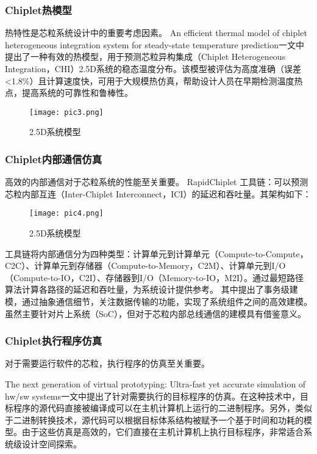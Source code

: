 \documentclass[bachelor]{thesis-uestc}
\begin{document}
\subsubsection{Chiplet热模型}
热特性是芯粒系统设计中的重要考虑因素。
An efficient thermal model of chiplet heterogeneous integration system for steady-state temperature prediction一文中提出了一种有效的热模型，用于预测芯粒异构集成（Chiplet Heterogeneous Integration，CHI）2.5D系统的稳态温度分布。该模型被评估为高度准确（误差 <1.8\%）且计算速度快，可用于大规模热仿真，帮助设计人员在早期检测温度热点，提高系统的可靠性和鲁棒性。
\begin{figure}[h]
    \texttt{[image: pic3.png]}
    \caption{2.5D系统模型}
    \label{pic3}
    \end{figure}


\subsubsection{Chiplet内部通信仿真}
高效的内部通信对于芯粒系统的性能至关重要。
RapidChiplet 工具链：可以预测芯粒内部互连（Inter-Chiplet Interconnect，ICI）的延迟和吞吐量。其架构如下：
\begin{figure}[h]
    \texttt{[image: pic4.png]}
    \caption{2.5D系统模型}
    \label{pic4}
    \end{figure}


    工具链将内部通信分为四种类型：计算单元到计算单元（Compute-to-Compute，C2C）、计算单元到存储器（Compute-to-Memory，C2M）、计算单元到I/O（Compute-to-IO，C2I）、存储器到I/O（Memory-to-IO，M2I）。通过最短路径算法计算各路径的延迟和吞吐量，为系统设计提供参考。
    其中提出了事务级建模，通过抽象通信细节，关注数据传输的功能，实现了系统组件之间的高效建模。虽然主要针对片上系统（SoC），但对于芯粒内部总线通信的建模具有借鉴意义。
    

\subsubsection{Chiplet执行程序仿真}
对于需要运行软件的芯粒，执行程序的仿真至关重要。


The next generation of virtual prototyping: Ultra-fast yet accurate simulation of hw/sw systems一文中提出了针对需要执行的目标程序的仿真。在这种技术中，目标程序的源代码直接被编译成可以在主机计算机上运行的二进制程序。另外，类似于二进制转换技术，源代码可以根据目标体系结构被赋予一个基于时间和功耗的模型。由于这些仿真是高效的，它们直接在主机计算机上执行目标程序，非常适合系统级设计空间探索。
\end{document}
